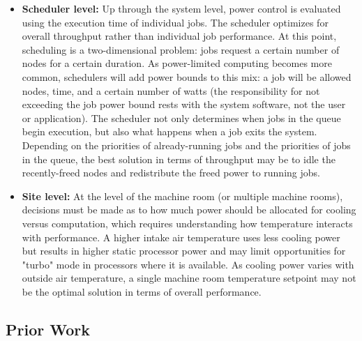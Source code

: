 \begin{itemize}
\item \textbf{Scheduler level:} Up through the system level, power control is evaluated
using the execution time of individual jobs. The scheduler optimizes for overall throughput
rather than individual job performance. At this point, scheduling is a two-dimensional 
problem: jobs request a certain number of nodes for a certain duration. As power-limited
computing becomes more common, schedulers will add power bounds to this mix: a job will
be allowed nodes, time, and a certain number of watts (the responsibility for not exceeding
the job power bound rests with the system software, not the user or application). The 
scheduler not only determines when jobs in the queue begin execution, but also what happens
when a job exits the system. Depending on the priorities of already-running jobs and the
priorities of jobs in the queue, the best solution in terms of throughput may be to idle
the recently-freed nodes and redistribute the freed power to running jobs.

\item \textbf{Site level:} At the level of the machine room (or multiple machine rooms),
decisions must be made as to how much power should be allocated for cooling versus computation,
which requires understanding how temperature interacts with performance. A higher intake
air temperature uses less cooling power but results in higher static processor power and 
may limit opportunities for "turbo" mode in processors where it is available. As cooling
power varies with outside air temperature, a single machine room temperature setpoint may 
not be the optimal solution in terms of overall performance. 

\end{itemize}

\subsection{Prior Work}
\label{sub:priorwork}


